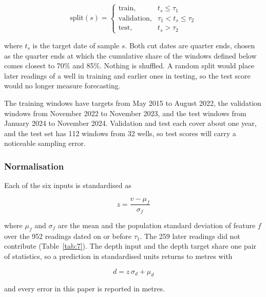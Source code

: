 \documentclass[conference]{IEEEtran}
\begin{document}
\begin{equation}
\mathrm{split}(s) = \begin{cases} \text{train}, & t_s \le \tau_1 \\ \text{validation}, & \tau_1 < t_s \le \tau_2 \\ \text{test}, & t_s > \tau_2 \end{cases}\label{eq:6}
\end{equation}

where \(t_s\) is the target date of sample \(s\). Both cut dates are quarter ends, chosen as the quarter ends at which the cumulative share of the windows defined below comes closest to 70\% and 85\%. Nothing is shuffled. A random split would place later readings of a well in training and earlier ones in testing, so the test score would no longer measure forecasting.

The training windows have targets from May 2015 to August 2022, the validation windows from November 2022 to November 2023, and the test windows from January 2024 to November 2024. Validation and test each cover about one year, and the test set has 112 windows from 32 wells, so test scores will carry a noticeable sampling error.

\subsubsection{Normalisation}

Each of the six inputs is standardised as

\begin{equation}
z = \frac{v - \mu_f}{\sigma_f}\label{eq:7}
\end{equation}

where \(\mu_f\) and \(\sigma_f\) are the mean and the population standard deviation of feature \(f\) over the 952 readings dated on or before \(\tau_1\). The 259 later readings did not contribute (Table~\ref{tab:7}). The depth input and the depth target share one pair of statistics, so a prediction in standardised units returns to metres with

\begin{equation}
d = z\,\sigma_d + \mu_d\label{eq:8}
\end{equation}

and every error in this paper is reported in metres.
\end{document}
